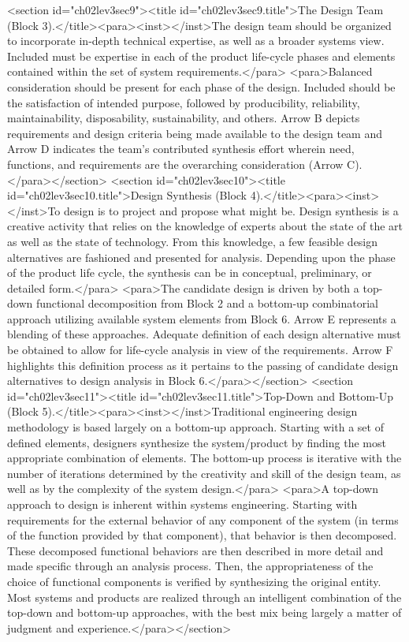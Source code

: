 <section id="ch02lev3sec9"><title id="ch02lev3sec9.title">The Design Team (Block 3).</title><para><inst></inst>The design team should be organized to incorporate in-depth technical expertise, as well as a broader systems view. Included must be expertise in each of the product life-cycle phases and elements contained within the set of system requirements.</para>
<para>Balanced consideration should be present for each phase of the design. Included should be the satisfaction of intended purpose, followed by producibility, reliability, maintainability, disposability, sustainability, and others. Arrow B depicts requirements and design criteria being made available to the design team and Arrow D indicates the team’s contributed synthesis effort wherein need, functions, and requirements are the overarching consideration (Arrow C).</para></section>
<section id="ch02lev3sec10"><title id="ch02lev3sec10.title">Design Synthesis (Block 4).</title><para><inst></inst>To design is to project and propose what might be. Design synthesis is a creative activity that relies on the knowledge of experts about the state of the art as well as the state of technology. From this knowledge, a few feasible design alternatives are fashioned and presented for analysis. Depending upon the phase of the product life cycle, the synthesis can be in conceptual, preliminary, or detailed form.</para>
<para>The candidate design is driven by both a top-down functional decomposition from Block 2 and a bottom-up combinatorial approach utilizing available system elements from Block 6. Arrow E represents a blending of these approaches. Adequate definition of each design alternative must be obtained to allow for life-cycle analysis in view of the requirements. Arrow F highlights this definition process as it pertains to the passing of candidate design alternatives to design analysis in Block 6.</para></section>
<section id="ch02lev3sec11"><title id="ch02lev3sec11.title">Top-Down and Bottom-Up (Block 5).</title><para><inst></inst>Traditional engineering design methodology is based largely on a bottom-up approach. Starting with a set of defined elements, designers synthesize the system/product by finding the most appropriate combination of elements. The bottom-up process is iterative with the number of iterations determined by the creativity and skill of the design team, as well as by the complexity of the system design.</para>
<para>A top-down approach to design is inherent within systems engineering. Starting with requirements for the external behavior of any component of the system (in terms of the function provided by that component), that behavior is then decomposed. These decomposed functional behaviors are then described in more detail and made specific through an analysis process. Then, the appropriateness of the choice of functional components is verified by synthesizing the original entity. Most systems and products are realized through an intelligent combination of the top-down and bottom-up approaches, with the best mix being largely a matter of judgment and experience.</para></section>
